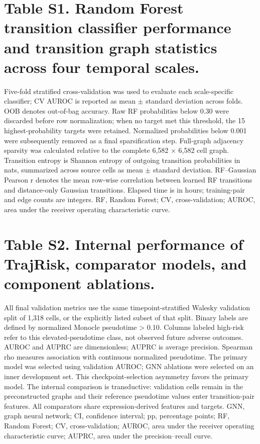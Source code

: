 \clearpage
\section*{Table S1. Random Forest transition classifier performance and transition graph statistics across four temporal scales.}

\noindent Five-fold stratified cross-validation was used to evaluate each scale-specific classifier; CV AUROC is reported as mean \(\pm\) standard deviation across folds. OOB denotes out-of-bag accuracy. Raw RF probabilities below 0.30 were discarded before row normalization; when no target met this threshold, the 15 highest-probability targets were retained. Normalized probabilities below 0.001 were subsequently removed as a final sparsification step. Full-graph adjacency sparsity was calculated relative to the complete 6,582 \(\times\) 6,582 cell graph. Transition entropy is Shannon entropy of outgoing transition probabilities in nats, summarized across source cells as mean \(\pm\) standard deviation. RF--Gaussian Pearson r denotes the mean row-wise correlation between learned RF transitions and distance-only Gaussian transitions. Elapsed time is in hours; training-pair and edge counts are integers. RF, Random Forest; CV, cross-validation; AUROC, area under the receiver operating characteristic curve.


\clearpage
\section*{Table S2. Internal performance of TrajRisk, comparator models, and component ablations.}
\label{tab:S2}
\noindent All final validation metrics use the same timepoint-stratified Walesky validation split of 1,318 cells, or the explicitly listed subset of that split. Binary labels are defined by normalized Monocle pseudotime > 0.10. Columns labeled high-risk refer to this elevated-pseudotime class, not observed future adverse outcomes. AUROC and AUPRC are dimensionless; AUPRC is average precision. Spearman rho measures association with continuous normalized pseudotime. The primary model was selected using validation AUROC; GNN ablations were selected on an inner development set. This checkpoint-selection asymmetry favors the primary model. The internal comparison is transductive: validation cells remain in the preconstructed graphs and their reference pseudotime values enter transition-pair features. All comparators share expression-derived features and targets. GNN, graph neural network; CI, confidence interval; pp, percentage points; RF, Random Forest; CV, cross-validation; AUROC, area under the receiver operating characteristic curve; AUPRC, area under the precision--recall curve.

